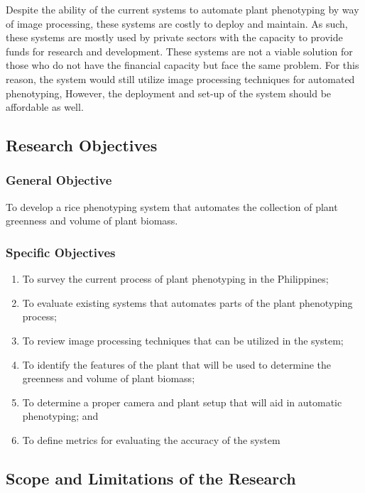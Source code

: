 	Despite the ability of the current systems to automate plant phenotyping by way of image processing, these systems are costly to deploy and maintain. As such, these systems are mostly used by private sectors with the capacity to provide funds for research and development. These systems are not a viable solution for those who do not have the financial capacity but face the same problem. For this reason, the system would still utilize image processing techniques for automated phenotyping, However, the deployment and set-up of the system should be affordable as well.


\subsection{Research Objectives}
\label{sec:researchobjectives}

\subsubsection{General Objective}
\label{sec:generalobjective}

To develop a rice phenotyping system that automates the collection of plant greenness and volume of plant biomass.

\subsubsection{Specific Objectives}
\label{sec:specificobjectives}

\begin{enumerate}
	\item To survey the current process of plant phenotyping in the Philippines;
    \item To evaluate existing systems that automates parts of the plant phenotyping process;
    \item To review image processing techniques that can be utilized in the system; 
    \item To identify the features of the plant that will be used to determine the greenness and volume of plant biomass;
    \item To determine a proper camera and plant setup that will aid in automatic phenotyping; and
    \item To define metrics for evaluating the accuracy of the system 

\end{enumerate}

\subsection{Scope and Limitations of the Research}
\label{sec:scopelimitations}

